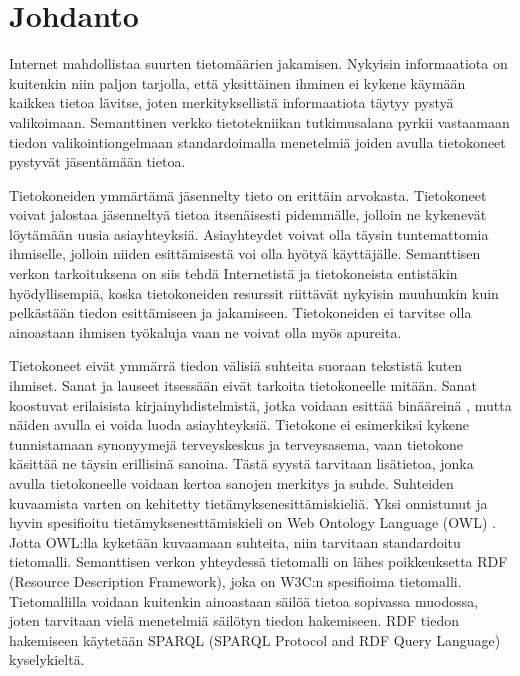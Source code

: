 \documentclass[finnish, 12pt, a4paper, elec, utf8, pdfa, online]{aaltothesis}
\begin{document}
\section{Johdanto}

\thispagestyle{empty}
Internet mahdollistaa suurten tietomäärien jakamisen. Nykyisin informaatiota on kuitenkin niin paljon tarjolla, että yksittäinen ihminen ei kykene käymään kaikkea tietoa lävitse, joten merkityksellistä informaatiota täytyy pystyä valikoimaan. Semanttinen verkko tietotekniikan tutkimusalana pyrkii vastaamaan tiedon valikointiongelmaan standardoimalla menetelmiä joiden avulla tietokoneet pystyvät jäsentämään tietoa.

Tietokoneiden ymmärtämä jäsennelty tieto on erittäin arvokasta. Tietokoneet voivat jalostaa jäsenneltyä tietoa itsenäisesti pidemmälle, jolloin ne kykenevät löytämään uusia asiayhteyksiä. Asiayhteydet voivat olla täysin tuntemattomia ihmiselle, jolloin niiden esittämisestä voi olla hyötyä käyttäjälle. Semanttisen verkon tarkoituksena on siis tehdä Internetistä ja tietokoneista entistäkin hyödyllisempiä, koska tietokoneiden resurssit riittävät nykyisin muuhunkin kuin pelkästään tiedon esittämiseen ja jakamiseen. Tietokoneiden ei tarvitse olla ainoastaan ihmisen työkaluja vaan ne voivat olla myös apureita.

Tietokoneet eivät ymmärrä tiedon välisiä suhteita suoraan tekstistä kuten ihmiset. Sanat ja lauseet itsessään eivät tarkoita tietokoneelle mitään. Sanat koostuvat erilaisista kirjainyhdistelmistä, jotka voidaan esittää binääreinä \cite{ASCII}, mutta näiden avulla ei voida luoda asiayhteyksiä. Tietokone ei esimerkiksi kykene tunnistamaan synonyymejä terveyskeskus ja terveysasema, vaan tietokone käsittää ne täysin erillisinä sanoina. Tästä syystä tarvitaan lisätietoa, jonka avulla tietokoneelle voidaan kertoa sanojen merkitys ja suhde. Suhteiden kuvaamista varten on kehitetty tietämyksenesittämiskieliä. Yksi onnistunut ja hyvin spesifioitu tietämyksenesttämiskieli on Web Ontology Language (OWL) \cite{OWL_specification}. Jotta OWL:lla kyketään kuvaamaan suhteita, niin tarvitaan standardoitu tietomalli. Semanttisen verkon yhteydessä tietomalli on lähes poikkeuksetta RDF (Resource Description Framework), joka on W3C:n spesifioima \cite{RDF_specification} tietomalli. Tietomallilla voidaan kuitenkin ainoastaan säilöä tietoa sopivassa muodossa, joten tarvitaan vielä menetelmiä säilötyn tiedon hakemiseen. RDF tiedon hakemiseen käytetään SPARQL (SPARQL Protocol and RDF Query Language) kyselykieltä.
\end{document}
